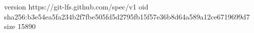 version https://git-lfs.github.com/spec/v1
oid sha256:b3e54ea5fa234b2f7fbe505fd5d2795fb15f57e36b8d64a589a12ce6719699d7
size 15890
